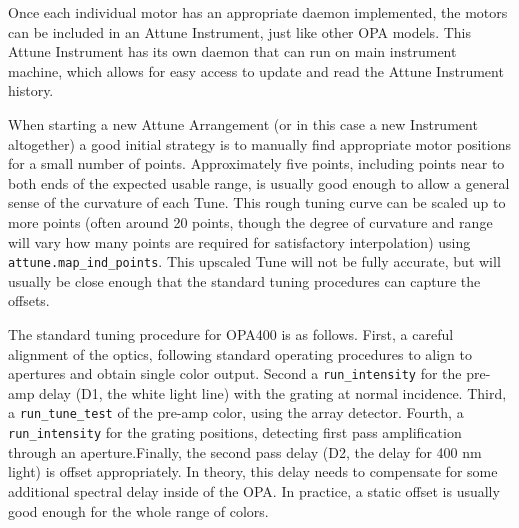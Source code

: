 Once each individual motor has an appropriate daemon implemented, the motors can be included in an Attune Instrument, just like other OPA models.
This Attune Instrument has its own daemon that can run on main instrument machine, which allows for easy access to update and read the Attune Instrument history.

When starting a new Attune Arrangement (or in this case a new Instrument altogether) a good initial strategy is to manually find appropriate motor positions for a small number of points.
Approximately five points, including points near to both ends of the expected usable range, is usually good enough to allow a general sense of the curvature of each Tune.
This rough tuning curve can be scaled up to more points (often around 20 points, though the degree of curvature and range will vary how many points are required for satisfactory interpolation) using \texttt{attune.map\_ind\_points}.
This upscaled Tune will not be fully accurate, but will usually be close enough that the standard tuning procedures can capture the offsets.

The standard tuning procedure for OPA400 is as follows.
First, a careful alignment of the optics, following standard operating procedures to align to apertures and obtain single color output.
Second a \texttt{run\_intensity} for the pre-amp delay (D1, the white light line) with the grating at normal incidence.
Third, a \texttt{run\_tune\_test} of the pre-amp color, using the array detector.
Fourth, a \texttt{run\_intensity} for the grating positions, detecting first pass amplification through an aperture.Finally, the second pass delay (D2, the delay for 400 nm light) is offset appropriately.
In theory, this delay needs to compensate for some additional spectral delay inside of the OPA.
In practice, a static offset is usually good enough for the whole range of colors.

\clearpage
